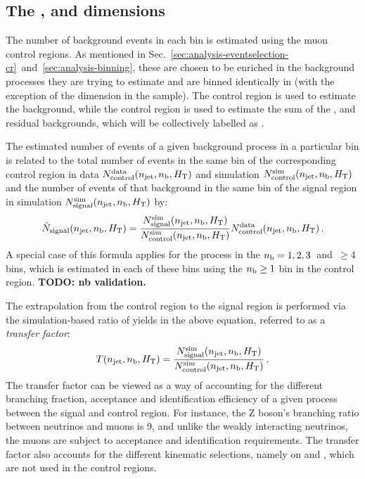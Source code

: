 \subsection{The \njet, \nb and \scalht dimensions}
\label{sec:analysis-estimation-njnbht}
The number of background events in each \njnbht bin is estimated using the muon 
control regions. As mentioned in 
Sec.~\ref{sec:analysis-eventselection-cr}~and~\ref{sec:analysis-binning}, these 
are chosen to be enriched in the background processes they are trying to 
estimate and are binned identically in \njnbht (with the exception of the \nb 
dimension in the \mmj sample). The \mmj control region is used to estimate the 
\znnj background, while the \mj control region is used to estimate the sum of 
the \wlj, \ttbar and residual backgrounds, which will be collectively labelled 
as \ttw.

The estimated number of events of a given background process in a particular 
\njnbht bin is related to the total number of events in the same bin of the 
corresponding control region in data $N_\mathrm{control}^\mathrm{data}(n_{\text{jet}}, n_{\text{b}}, \mbox{$H_\text{T}$})$ 
and simulation $N_\mathrm{control}^\mathrm{sim}(n_{\text{jet}}, n_{\text{b}}, \mbox{$H_\text{T}$})$ and the number of 
events of that background in the same bin of the signal region in simulation 
$N_\mathrm{signal}^\mathrm{sim}(n_{\text{jet}}, n_{\text{b}}, \mbox{$H_\text{T}$})$ by:
\begin{equation}
\label{eqn:estimation}
\hat{N}_\mathrm{signal}(n_{\text{jet}}, n_{\text{b}}, \mbox{$H_\text{T}$}) = 
\frac{N_\mathrm{signal}^\mathrm{sim}(n_{\text{jet}}, n_{\text{b}}, \mbox{$H_\text{T}$})}{N_\mathrm{control}^\mathrm{sim}(n_{\text{jet}}, n_{\text{b}}, \mbox{$H_\text{T}$})}
 N_\mathrm{control}^\mathrm{data}(n_{\text{jet}}, n_{\text{b}}, \mbox{$H_\text{T}$}) \, .
\end{equation}
A special case of this formula applies for the \znnj process in the $n_{\text{b}}=1, 2, 
3$~and~$\ge4$ bins, which is estimated in each of these bins using the $n_{\text{b}} \ge 
1$ bin in the \mmj control region.
\textbf{TODO: nb validation.}

The extrapolation from the control region to the signal region is performed via 
the simulation-based ratio of yields in the above equation, referred to as a 
\textit{transfer factor}:
\begin{equation}
T(n_{\text{jet}}, n_{\text{b}}, \mbox{$H_\text{T}$})  = 
\frac{N_\mathrm{signal}^\mathrm{sim}(n_{\text{jet}}, n_{\text{b}}, \mbox{$H_\text{T}$})}{N_\mathrm{control}^\mathrm{sim}(n_{\text{jet}}, n_{\text{b}}, \mbox{$H_\text{T}$})}
 \, .
\end{equation}
The transfer factor can be viewed as a way of accounting for the different 
branching fraction, acceptance and identification efficiency of a given process 
between the signal and control region. For instance, the Z boson's branching 
ratio between neutrinos and muons is 9, and unlike the weakly interacting 
neutrinos, the muons are subject to acceptance and identification requirements. 
The transfer factor also accounts for the different kinematic selections, 
namely on \alphat and \bdphi, which are not used in the control regions.

